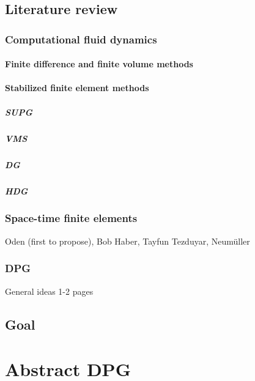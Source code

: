 \documentclass{report}
\begin{document}
\section{Literature review}

\subsection{Computational fluid dynamics}

\subsubsection{Finite difference and finite volume methods}

\subsubsection{Stabilized finite element methods}
\paragraph{SUPG}
\paragraph{VMS}
\paragraph{DG}
\paragraph{HDG}

\subsection{Space-time finite elements}
Oden (first to propose), Bob Haber, Tayfun Tezduyar, Neum\"{u}ller
\cite{Klaij2006}
\cite{Rhebergen2013}

\subsection{DPG}
General ideas 1-2 pages


\section{Goal}



\chapter{Abstract DPG}
\end{document}
